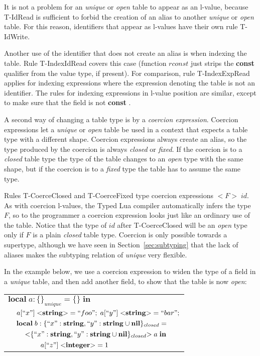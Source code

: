 \documentclass[10pt]{sigplanconf}
\newcommand{\Nil}{\mathbf{nil}}
\newcommand{\Integer}{\mathbf{integer}}
\newcommand{\String}{\mathbf{string}}
\begin{document}
It is not a problem for an {\em unique} or {\em open}
table to appear as an l-value, because {\sc T-IdRead} is
sufficient to forbid the creation of an alias to another
{\em unique} or {\em open} table. For this reason,
identifiers that appear as l-values have their own rule
{\sc T-IdWrite}.

Another use of the identifier that does not create an
alias is when indexing the table. Rule {\sc T-IndexIdRead}
covers this case (function $rconst$ just strips the {\bf const} qualifier from the value type, if present). For comparison, rule {\sc T-IndexExpRead}
applies for indexing expressions where the expression
denoting the table is not an identifier. The rules for
indexing expressions in l-value position are similar,
except to make sure that the field is not {\bf const} .

A second way of changing a table type is by a 
{\em coercion expression}. Coercion expressions let
a {\em unique} or {\em open} table be used in a context
that expects a table type with a different shape.
Coercion expressions always create an alias, so
the type produced by the coercion is always
{\em closed} or {\em fixed}. If the coercion is to a
{\em closed} table type the type of the table changes
to an {\em open} type with the same shape, but if
the coercion is to a {\em fixed} type the table has
to assume the same type.

Rules {\sc T-CoerceClosed} and {\sc T-CoerceFixed} type
coercion expressions ${<}F{>} \; id$.
As with coercion l-values, the Typed Lua compiler automatically
infers the type $F$, so to the programmer a coercion
expression looks just like an ordinary use of the table.
Notice that the type of $id$ after {\sc T-CoerceClosed} will be an {\em open} type
only if $F$ is a plain {\em closed} table type.
Coercion is only possible towards a supertype, although
we have seen in Section~\ref{sec:subtyping} that the lack
of aliases makes the subtyping relation of {\em unique}
very flexible.

In the example below, we use a coercion expression to
widen the type of a field in a {\em unique}
table, and then add another field, to show that the
table is now {\em open}:
{\footnotesize
\begin{center}
\begin{tabular}{llll}
\multicolumn{4}{l}{$\mathbf{local} \; a:\{\}_{unique} = \{ \} \; \mathbf{in}$}\\
& \multicolumn{3}{l}{$a[``x"] \; {<}\String{>} = ``foo";\;
a[``y"] \; {<}\String{>} = ``bar";$}\\
& \multicolumn{3}{l}{$\mathbf{local} \; b:\{``x":\String, ``y":\String \cup \Nil \}_{closed} =$}\\
& & \multicolumn{2}{l}{${<}\{``x":\String, ``y":\String \cup \Nil\}_{closed}{>} \; a \; \mathbf{in}$}\\
& & & \multicolumn{1}{l}{$a[``z"] \; {<}\Integer{>} = 1$}
\end{tabular}
\end{center}
}
\end{document}
